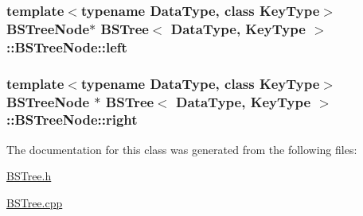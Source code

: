 \subsubsection[{\texorpdfstring{left}{left}}]{\setlength{\rightskip}{0pt plus 5cm}template$<$typename Data\+Type, class Key\+Type$>$ {\bf B\+S\+Tree\+Node}$\ast$ {\bf B\+S\+Tree}$<$ Data\+Type, Key\+Type $>$\+::B\+S\+Tree\+Node\+::left}\hypertarget{class_b_s_tree_1_1_b_s_tree_node_a7a90150dd249432e240dc363955c5ca1}{}\label{class_b_s_tree_1_1_b_s_tree_node_a7a90150dd249432e240dc363955c5ca1}
\subsubsection[{\texorpdfstring{right}{right}}]{\setlength{\rightskip}{0pt plus 5cm}template$<$typename Data\+Type, class Key\+Type$>$ {\bf B\+S\+Tree\+Node} $\ast$ {\bf B\+S\+Tree}$<$ Data\+Type, Key\+Type $>$\+::B\+S\+Tree\+Node\+::right}\hypertarget{class_b_s_tree_1_1_b_s_tree_node_a8d7bfd0208a562c8b8ab332e1d796563}{}\label{class_b_s_tree_1_1_b_s_tree_node_a8d7bfd0208a562c8b8ab332e1d796563}


The documentation for this class was generated from the following files\+:\begin{DoxyCompactItemize}
\item 
\hyperlink{_b_s_tree_8h}{B\+S\+Tree.\+h}\item 
\hyperlink{_b_s_tree_8cpp}{B\+S\+Tree.\+cpp}\end{DoxyCompactItemize}
